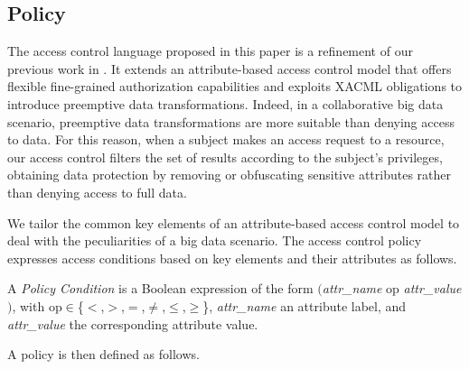 \subsection{Policy}
The access control language proposed in this paper is a refinement of our previous work in \cite{MEDES2021}.
It extends an attribute-based access control model that offers flexible fine-grained authorization capabilities and exploits XACML \cite{XACML} obligations to introduce preemptive data transformations.
Indeed, in a collaborative big data scenario, preemptive data transformations are more suitable than denying access to data.
For this reason, when a subject makes an access request to a resource, our access control filters the set of results according to the subject's privileges, obtaining data protection by removing or obfuscating sensitive attributes rather than denying access to full data.

We tailor the common key elements of an attribute-based access control model to deal with the peculiarities of a big data scenario.
The access control policy expresses access conditions based on key elements and their attributes as follows.

\begin{definition}\label{def:policy_cond}
  A \emph{Policy Condition} is a Boolean expression of the form $($\emph{attr\_name} op \emph{attr\_value}$)$, with op$\in$\{$<$,$>$,$=$,$\neq$,$\leq$,$\geq$\}, \emph{attr\_name} an attribute label, and \emph{attr\_value} the corresponding attribute value.
\end{definition}

A policy is then defined as follows.

